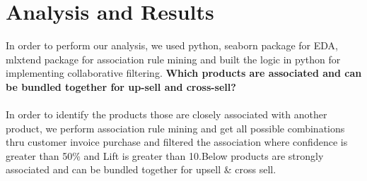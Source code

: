 \documentclass[11pt]{article} %
\begin{document}
\section{Analysis and Results}
In order to perform our analysis, we used python, seaborn package for EDA, mlxtend package\cite{12}\cite{13} for association rule mining and built the logic in python for implementing collaborative filtering.
\textbf{Which products are associated and can be bundled together for up-sell and cross-sell?}\\\\
In order to identify the products those are closely associated with another product, we perform association rule mining and get all possible combinations thru customer invoice purchase and filtered the association where confidence is greater than 50\% and Lift is greater than 10.Below products are strongly associated and can be bundled together for upsell \& cross sell. 
\end{document}
